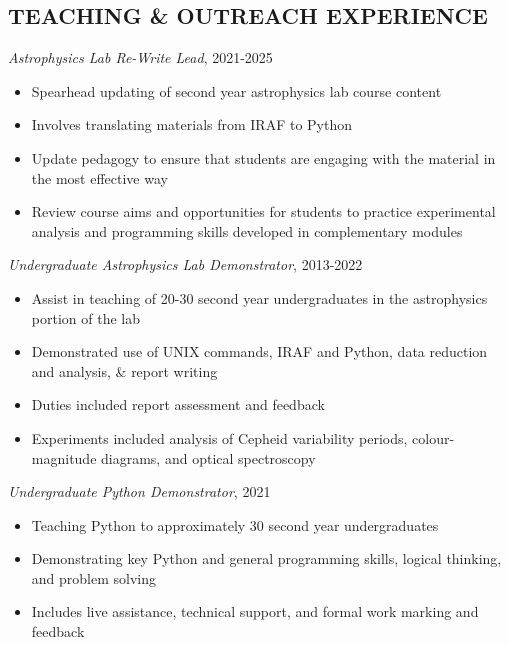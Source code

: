 \documentclass[letter, margin, 10pt]{res} %
\begin{document}
\begin{resume}
 \vspace{-6pt}
\section{TEACHING \& OUTREACH EXPERIENCE}

{\sl Astrophysics Lab Re-Write Lead}, 2021-2025
\begin{itemize}[noitemsep,topsep=0pt,parsep=0pt,partopsep=0pt]
\item Spearhead updating of second year astrophysics lab course content
\item Involves translating materials from IRAF to Python
\item Update pedagogy to ensure that students are engaging with the material in the most effective way
\item Review course aims and opportunities for students to practice experimental analysis and programming skills developed in complementary modules
\end{itemize}

\vspace{-10pt}

{\sl Undergraduate Astrophysics Lab Demonstrator}, 2013-2022
\begin{itemize}[noitemsep,topsep=0pt,parsep=0pt,partopsep=0pt]
\item Assist in teaching of 20-30 second year undergraduates in the astrophysics portion of the lab
\item Demonstrated use of UNIX commands, IRAF and Python, data reduction and analysis, \& report writing
\item Duties included report assessment and feedback
\item Experiments included analysis of Cepheid variability periods, colour-magnitude diagrams, and optical spectroscopy
\end{itemize}

\vspace{-10pt}

{\sl Undergraduate Python Demonstrator}, 2021
\begin{itemize}[noitemsep,topsep=0pt,parsep=0pt,partopsep=0pt]
\item Teaching Python to approximately 30 second year undergraduates
\item Demonstrating key Python and general programming skills, logical thinking, and problem solving
\item Includes live assistance, technical support, and formal work marking and feedback
\end{itemize}


\end{resume}
\end{document}
